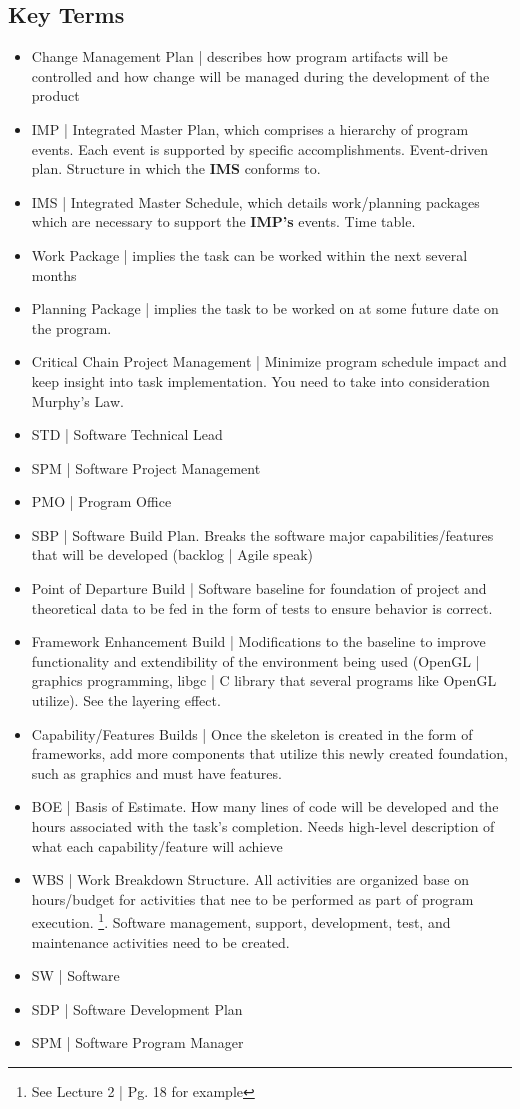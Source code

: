 \documentclass{article}
\begin{document}
\subsection{Key Terms}

\begin{itemize}

\item Change Management Plan | describes how program artifacts will be controlled and how change will be managed during the development of the product
\item IMP | Integrated Master Plan, which comprises a hierarchy of program events. Each event is supported by specific accomplishments. Event-driven plan. Structure in which the \textbf{IMS} conforms to.
\item IMS | Integrated Master Schedule, which details work/planning packages which are necessary to support the \textbf{IMP's} events. Time table.
\item Work Package | implies the task can be worked within the next several months
\item Planning Package  | implies the task to be worked on at some future date on the program.
\item Critical Chain Project Management | Minimize program schedule impact and keep insight into task implementation. You need to take into consideration Murphy's Law.
\item STD | Software Technical Lead
\item SPM | Software Project Management
\item PMO | Program Office
\item SBP | Software Build Plan. Breaks the software major capabilities/features that will be developed (backlog | Agile speak)
\item Point of Departure Build | Software baseline for foundation of project and theoretical data to be fed in the form of tests to ensure behavior is correct.
\item Framework Enhancement Build | Modifications to the baseline to improve functionality and extendibility of the environment being used (OpenGL | graphics programming, libgc | C library that several programs like OpenGL utilize). See the layering effect.
\item Capability/Features Builds | Once the skeleton is created in the form of frameworks, add more components that utilize this newly created foundation, such as graphics and must have features.
\item BOE | Basis of Estimate. How many lines of code will be developed and the hours associated with the task's completion. Needs high-level description of what each capability/feature will achieve 
\item WBS | Work Breakdown Structure. All activities are organized base on hours/budget for activities that nee to be performed as part of program execution. \footnote{See Lecture 2 | Pg. 18 for example}. Software management, support, development, test, and maintenance activities need to be created.
\item SW | Software
\item SDP | Software Development Plan
\item SPM | Software Program Manager



\end{itemize}
\end{document}
